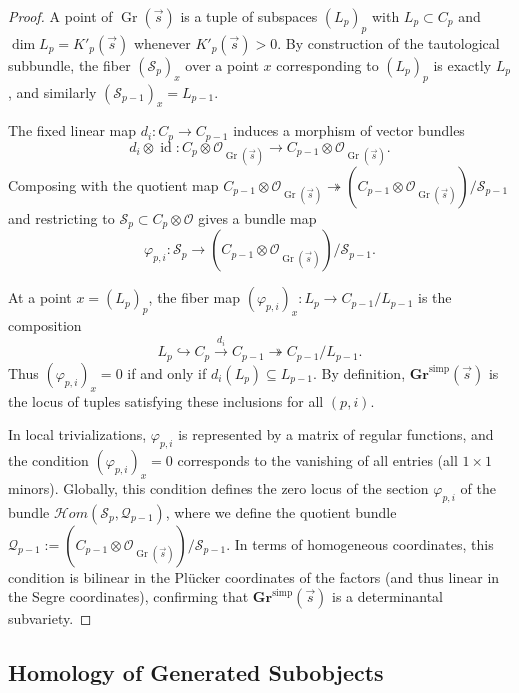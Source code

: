 \begin{proof}
A point of $\operatorname{Gr}(\vec s)$ is a tuple of subspaces
$(L_p)_p$ with $L_p \subset C_p$ and $\dim L_p = K'_p(\vec s)$ whenever
$K'_p(\vec s)>0$. By construction of the tautological subbundle,
the fiber $(\mathcal{S}_p)_x$ over a point $x$ corresponding to
$(L_p)_p$ is exactly $L_p$, and similarly $(\mathcal{S}_{p-1})_x = L_{p-1}$.

The fixed linear map $d_i : C_p \to C_{p-1}$ induces a morphism of
vector bundles
\[
d_i \otimes \operatorname{id} : C_p \otimes \mathcal{O}_{\operatorname{Gr}(\vec s)}
 \longrightarrow C_{p-1} \otimes \mathcal{O}_{\operatorname{Gr}(\vec s)}.
\]
Composing with the quotient map
$C_{p-1} \otimes \mathcal{O}_{\operatorname{Gr}(\vec s)}
 \twoheadrightarrow (C_{p-1} \otimes \mathcal{O}_{\operatorname{Gr}(\vec s)})/\mathcal{S}_{p-1}$
and restricting to $\mathcal{S}_p \subset C_p \otimes \mathcal{O}$ gives
a bundle map
\[
\varphi_{p,i} : \mathcal{S}_p \to
 (C_{p-1} \otimes \mathcal{O}_{\operatorname{Gr}(\vec s)})/\mathcal{S}_{p-1}.
\]

At a point $x=(L_p)_p$, the fiber map
$(\varphi_{p,i})_x : L_p \to C_{p-1}/L_{p-1}$ is the composition
\[
L_p \hookrightarrow C_p \xrightarrow{d_i} C_{p-1} \twoheadrightarrow C_{p-1}/L_{p-1}.
\]
Thus $(\varphi_{p,i})_x = 0$ if and only if $d_i(L_p) \subseteq L_{p-1}$.
By definition, $\mathbf{Gr}^{\mathrm{simp}}(\vec s)$ is the locus of tuples satisfying
these inclusions for all $(p,i)$.

In local trivializations, $\varphi_{p,i}$ is represented by a matrix of regular functions,
and the condition $(\varphi_{p,i})_x=0$ corresponds to the vanishing of all entries
(all $1\times 1$ minors).
Globally, this condition defines the zero locus of the section $\varphi_{p,i}$ of the bundle
$\mathcal{H}om(\mathcal{S}_p, \mathcal{Q}_{p-1})$, where we define the quotient bundle
$\mathcal{Q}_{p-1} := (C_{p-1} \otimes \mathcal{O}_{\operatorname{Gr}(\vec s)})/\mathcal{S}_{p-1}$.
In terms of homogeneous coordinates, this condition is bilinear in the Plücker coordinates
of the factors (and thus linear in the Segre coordinates), confirming that
$\mathbf{Gr}^{\mathrm{simp}}(\vec s)$ is a determinantal subvariety.
\end{proof}


\subsection{Homology of Generated Subobjects}

